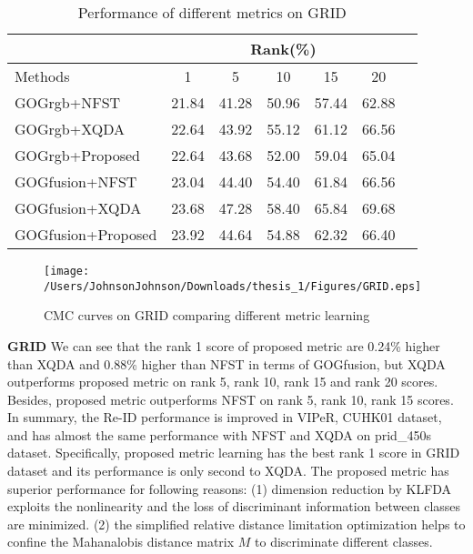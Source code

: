 \begin{table}[H]
\caption{Performance of different metrics on GRID}
\centering
\begin{tabular}{|l|c|c|c|c|c|c|}
\hline
& \multicolumn{5}{|c|}{Rank(\%)} \\
\hline
Methods& 1 & 5 &10& 15&20\\
\hline
GOGrgb+NFST& 21.84&41.28 &50.96& 57.44&62.88 \\ 
\hline
GOGrgb+XQDA& 22.64&43.92 &55.12 &61.12&66.56\\ 
\hline
GOGrgb+Proposed&22.64&43.68&52.00&59.04&65.04\\  %
\hline
GOGfusion+NFST& 23.04&44.40 &54.40 &61.84&66.56\\ 
\hline
GOGfusion+XQDA& 23.68&47.28 &58.40 &65.84&69.68 \\ 
\hline
GOGfusion+Proposed&23.92&44.64&54.88&62.32&66.40\\ %

\hline

\end{tabular}
\end{table}

\begin{figure}[H]
\begin{raggedleft}
\texttt{[image: /Users/JohnsonJohnson/Downloads/thesis\_1/Figures/GRID.eps]}
\vspace{-3em}
\caption{CMC curves on GRID comparing different metric learning}
\end{raggedleft}
\end{figure}

\textbf{GRID} We can see that the rank 1 score of proposed metric are 0.24\% higher than XQDA and 0.88\% higher than NFST in terms of GOGfusion, but XQDA outperforms proposed metric on rank 5, rank 10, rank 15 and rank 20 scores. Besides, proposed metric outperforms NFST on rank 5, rank 10, rank 15 scores.\\
\indent In summary, the Re-ID performance is improved in VIPeR, CUHK01 dataset, and has almost the same performance with NFST and XQDA on prid\_450s dataset. Specifically, proposed metric learning has the best rank 1 score in GRID dataset and its performance is only second to XQDA. The proposed metric has superior performance for following reasons: (1) dimension reduction by KLFDA exploits the nonlinearity and the loss of discriminant information between classes are minimized. (2) the simplified relative distance limitation optimization helps to confine the Mahanalobis distance matrix $M$ to discriminate different classes.  

